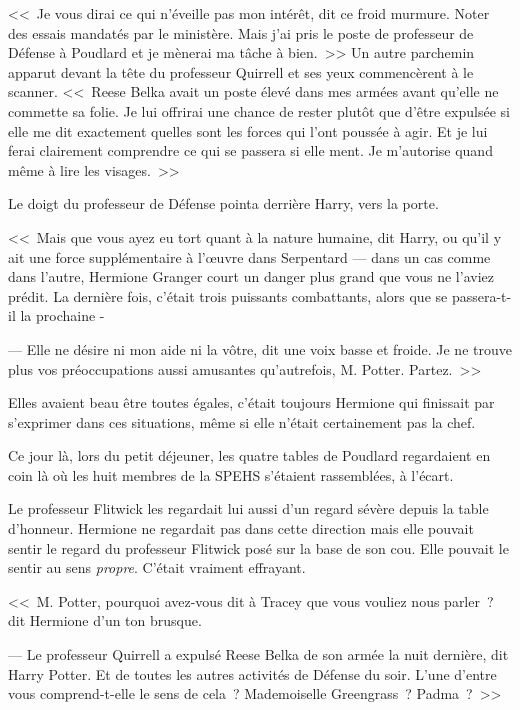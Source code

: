 <<~Je vous dirai ce qui n'éveille pas mon intérêt, dit ce froid murmure. Noter des essais mandatés par le ministère. Mais j'ai pris le poste de professeur de Défense à Poudlard et je mènerai ma tâche à bien.~>> Un autre parchemin apparut devant la tête du professeur Quirrell et ses yeux commencèrent à le scanner. <<~Reese Belka avait un poste élevé dans mes armées avant qu'elle ne commette sa folie. Je lui offrirai une chance de rester plutôt que d'être expulsée si elle me dit exactement quelles sont les forces qui l'ont poussée à agir. Et je lui ferai clairement comprendre ce qui se passera si elle ment. Je m'autorise quand même à lire les visages.~>>

Le doigt du professeur de Défense pointa derrière Harry, vers la porte.

<<~Mais que vous ayez eu tort quant à la nature humaine, dit Harry, ou qu'il y ait une force supplémentaire à l'œuvre dans Serpentard — dans un cas comme dans l'autre, Hermione Granger court un danger plus grand que vous ne l'aviez prédit. La dernière fois, c'était trois puissants combattants, alors que se passera-t-il la prochaine -

--- Elle ne désire ni mon aide ni la vôtre, dit une voix basse et froide. Je ne trouve plus vos préoccupations aussi amusantes qu'autrefois, M. Potter. Partez.~>>

\later

Elles avaient beau être toutes égales, c'était toujours Hermione qui finissait par s'exprimer dans ces situations, même si elle n'était certainement pas la chef.

Ce jour là, lors du petit déjeuner, les quatre tables de Poudlard regardaient en coin là où les huit membres de la SPEHS s'étaient rassemblées, à l'écart.

Le professeur Flitwick les regardait lui aussi d'un regard sévère depuis la table d'honneur. Hermione ne regardait pas dans cette direction mais elle pouvait sentir le regard du professeur Flitwick posé sur la base de son cou. Elle pouvait le sentir au sens \emph{propre}. C'était vraiment effrayant.

<<~M. Potter, pourquoi avez-vous dit à Tracey que vous vouliez nous parler~? dit Hermione d'un ton brusque.

--- Le professeur Quirrell a expulsé Reese Belka de son armée la nuit dernière, dit Harry Potter. Et de toutes les autres activités de Défense du soir. L'une d'entre vous comprend-t-elle le sens de cela~? Mademoiselle Greengrass~? Padma~?~>>

